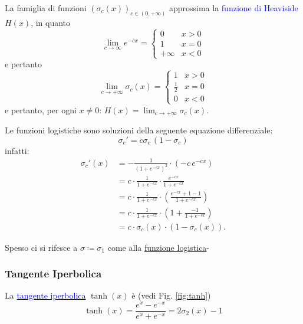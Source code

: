 \documentclass[10pt]{book}
\newcommand{\1}{\mathds{1}}
\theoremstyle{definition}%
\theoremstyle{plain}
\theoremstyle{remark}
\renewcommand{\href}[2]{\textcolor{blue}{#2}}
\begin{document}
La famiglia di funzioni \((\sigma_{c}(x))_{c \in (0,+\infty)}\) approssima la \href{../../../../../org/roam/20250624161413-funzione_di_heaviside.org}{funzione di Heaviside} \(H(x)\), in quanto
\begin{equation*}
\lim_{c\to \infty} e^{-cx} = \begin{cases}
0 & x>0\\
1 & x=0\\
+ \infty & x<0
\end{cases}
\end{equation*}
e pertanto
\begin{equation*}
\lim_{c\to+\infty} \sigma_{c}(x) = \begin{cases}
1 &x>0\\
\frac{1}{2} & x=0\\
0 &x<0
\end{cases}
\end{equation*}
e pertanto, per ogni \(x\neq 0\): \(H(x) =\lim_{c\to+\infty}\sigma_{c}(x)\).

Le funzioni logistiche sono soluzioni della seguente equazione differenziale:
\begin{equation*}
\sigma_{c}' = c\sigma_{c}\,(1-\sigma_{c})
\end{equation*}
infatti:
\begin{align*}
\sigma_{c}'(x) &= - \frac{1}{(1+e^{-cx})^{2}} \cdot (-c\,e^{-cx})\\
&= c \cdot \frac{1}{1+e^{-cx}} \cdot \frac{e^{-cx}}{1+e^{-cx}}\\
&= c \cdot \frac{1}{1+e^{-cx}} \cdot \left(\frac{e^{-cx}+1-1}{1+e^{-cx}}\right)\\
&= c \cdot \frac{1}{1+e^{-cx}} \cdot \left(1+\frac{-1}{1+e^{-cx}}\right)\\
&= c\cdot \sigma_{c}(x) \cdot (1-\sigma_{c}(x)).
\end{align*}

Spesso ci si rifesce a \(\sigma\coloneqq \sigma_{1}\) come alla \uline{funzione logistica}-
\subsubsection{Tangente Iperbolica}
\label{sec:orge67ef44}

La \uline{\href{../../../../../org/roam/20250627184228-funzioni_iperboliche.org}{tangente iperbolica}} \(\tanh(x)\) è (vedi Fig. \ref{fig:tanh})
\begin{equation*}
\tanh(x) = \frac{e^{x}-e^{-x}}{e^{x}+e^{-x}} = 2\sigma_{2}(x)-1
\end{equation*}
\end{document}
